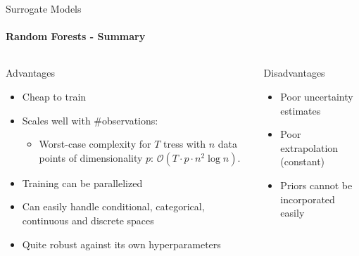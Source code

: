\begin{frame}[c]{Surrogate Models}
\framesubtitle{Random Forests - Summary}

\begin{columns}[T] %
\begin{column}{.48\textwidth}

    \begin{block}{Advantages}
    \begin{itemize}
        \item Cheap to train 
        \item Scales well with \#observations: 
        \begin{itemize}
        	\item Worst-case complexity for $T$ tress with $n$ data points of dimensionality $p$: $\mathcal O(T\cdot p \cdot n^2 \log{n})$. 
        \end{itemize}
        \item Training can be parallelized 
        \item Can easily handle conditional, categorical, continuous and discrete spaces 
        \item Quite robust against its own hyperparameters
    \end{itemize}
    \end{block}
\end{column}%

\hfill%
\pause

\begin{column}{.48\textwidth}
    \begin{block}{Disadvantages}
    \begin{itemize}
        \item Poor uncertainty estimates 
        \item Poor extrapolation (constant) 
    	\item Priors cannot be incorporated easily 
    \end{itemize}
    \end{block}

\end{column}
\end{columns}

\end{frame}
